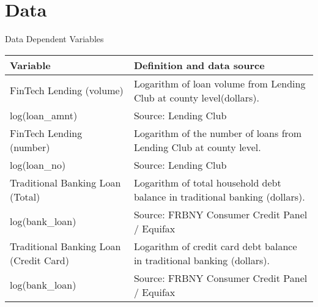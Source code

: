 \documentclass[11pt]{beamer}
\begin{document}
\section{Data}

\begin{frame}{Data}
    Dependent Variables
    \begin{tabular}{|p{4cm}|p{6cm}|}
        \hline
        \textbf{Variable} & \textbf{Definition and data source}  \\ 
        \hline
        FinTech Lending (volume) & Logarithm of loan volume from Lending Club at county level(dollars).   \\
        log(loan\_amnt) & Source: Lending Club   \\ 
        \hline
        FinTech Lending (number)  & Logarithm of the number of loans from Lending Club at county level.    \\
        log(loan\_no) & Source: Lending Club   \\
        \hline
        Traditional Banking Loan (Total) & Logarithm of total household debt balance in traditional banking (dollars).     \\ 
        log(bank\_loan) & Source: FRBNY Consumer Credit Panel / Equifax   \\ 
        \hline
        Traditional Banking Loan (Credit Card) & Logarithm of credit card debt balance in traditional banking (dollars).    \\ 
        log(bank\_loan) & Source: FRBNY Consumer Credit Panel / Equifax   \\ 
        \hline
    \end{tabular}
\end{frame}
\end{document}
